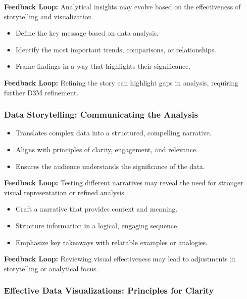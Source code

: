 \documentclass[
  11pt,
]{article}
\providecommand{\tightlist}{%
  \setlength{\itemsep}{0pt}\setlength{\parskip}{0pt}}
\begin{document}
\textbf{Feedback Loop:} Analytical insights may evolve based on the
effectiveness of storytelling and visualization.

\begin{itemize}
\tightlist
\item
  Define the key message based on data analysis.
\item
  Identify the most important trends, comparisons, or relationships.
\item
  Frame findings in a way that highlights their significance.
\end{itemize}

\textbf{Feedback Loop:} Refining the story can highlight gaps in
analysis, requiring further D3M refinement.

\subsubsection{\texorpdfstring{\textbf{Data Storytelling: Communicating
the
Analysis}}{Data Storytelling: Communicating the Analysis}}\label{data-storytelling-communicating-the-analysis}

\begin{itemize}
\tightlist
\item
  Translates complex data into a structured, compelling narrative.
\item
  Aligns with principles of clarity, engagement, and relevance.
\item
  Ensures the audience understands the significance of the data.
\end{itemize}

\textbf{Feedback Loop:} Testing different narratives may reveal the need
for stronger visual representation or refined analysis.

\begin{itemize}
\tightlist
\item
  Craft a narrative that provides context and meaning.
\item
  Structure information in a logical, engaging sequence.
\item
  Emphasize key takeaways with relatable examples or analogies.
\end{itemize}

\textbf{Feedback Loop:} Reviewing visual effectiveness may lead to
adjustments in storytelling or analytical focus.

\subsubsection{\texorpdfstring{\textbf{Effective Data Visualizations:
Principles for
Clarity}}{Effective Data Visualizations: Principles for Clarity}}\label{effective-data-visualizations-principles-for-clarity}
\end{document}
